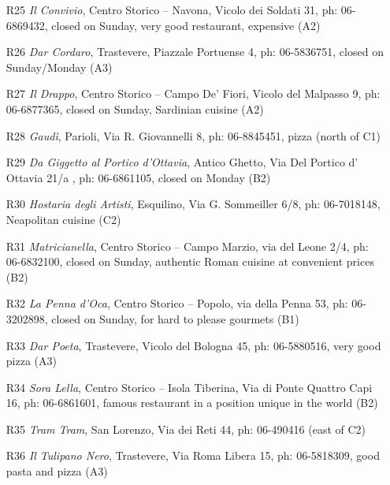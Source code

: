 \documentclass[twocolumn,10pt]{article}
\begin{document}
\begin{enumerate}
\item[R25] {\em Il Convivio}, Centro Storico -- Navona, Vicolo dei 
Soldati 31, ph: 06-6869432, closed on Sunday, very good restaurant, 
expensive (A2)

\item[R26] {\em Dar Cordaro}, Trastevere, Piazzale Portuense 4, ph: 
06-5836751, closed on Sunday/Monday (A3)

\item[R27] {\em Il Drappo}, Centro Storico -- Campo De' Fiori, Vicolo 
del Malpasso 9, ph: 06-6877365, closed on Sunday, Sardinian cuisine 
(A2)

\item[R28] {\em Gaud\`i}, Parioli, Via R. Giovannelli 8, ph: 
06-8845451, pizza (north of C1)

\item[R29] {\em Da Giggetto al Portico d'Ottavia}, Antico Ghetto, Via 
Del Portico d' Ottavia 21/a	, ph: 06-6861105, closed on Monday (B2)

\item[R30] {\em Hostaria degli Artisti}, Esquilino, Via G. Sommeiller 
6/8, ph: 06-7018148, Neapolitan cuisine (C2)

\item[R31] {\em Matricianella}, Centro Storico -- Campo Marzio, via  
del Leone 2/4, ph: 06-6832100, closed on Sunday, authentic Roman 
cuisine at convenient prices (B2)

\item[R32] {\em La Penna d'Oca}, Centro Storico -- Popolo, via  della 
Penna 53, ph: 06-3202898, closed on Sunday, for hard to please 
gourmets (B1)

\item[R33] {\em Dar Poeta}, Trastevere, Vicolo del  Bologna 45, ph: 
06-5880516, very good pizza (A3)

\item[R34] {\em Sora Lella}, Centro Storico -- Isola Tiberina, Via di 
Ponte Quattro Capi 16, ph: 06-6861601, famous restaurant in a 
position unique in the world (B2)

\item[R35] {\em Tram Tram}, San Lorenzo, Via dei Reti 44, ph: 
06-490416 (east of C2)

\item[R36] {\em Il Tulipano Nero}, Trastevere, Via Roma Libera 15,
ph: 06-5818309, good pasta and pizza (A3)

\end{enumerate}
\end{document}
